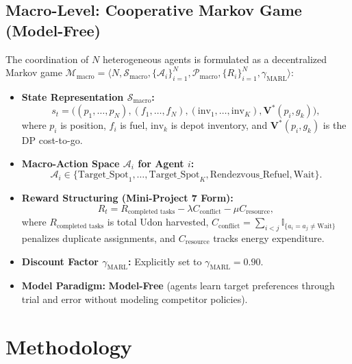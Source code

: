 \documentclass[11pt,a4paper]{article}
\begin{document}
\subsection{Macro-Level: Cooperative Markov Game (Model-Free)}
The coordination of $N$ heterogeneous agents is formulated as a decentralized Markov game $\mathcal{M}_{\text{macro}} = \langle N, \mathcal{S}_{\text{macro}}, \{\mathcal{A}_i\}_{i=1}^N, \mathcal{P}_{\text{macro}}, \{R_i\}_{i=1}^N, \gamma_{\text{MARL}} \rangle$:
\begin{itemize}
    \item \textbf{State Representation $\mathcal{S}_{\text{macro}}$:}
    \begin{equation}
        s_t = \Big( (p_1, \dots, p_N), (f_1, \dots, f_N), (\text{inv}_1, \dots, \text{inv}_K), \mathbf{V}^*(p_i, g_k) \Big),
    \end{equation}
    where $p_i$ is position, $f_i$ is fuel, $\text{inv}_k$ is depot inventory, and $\mathbf{V}^*(p_i, g_k)$ is the DP cost-to-go.
    \item \textbf{Macro-Action Space $\mathcal{A}_i$ for Agent $i$:}
    \begin{equation}
        \mathcal{A}_i \in \{\text{Target\_Spot}_1, \dots, \text{Target\_Spot}_K, \text{Rendezvous\_Refuel}, \text{Wait}\}.
    \end{equation}
    \item \textbf{Reward Structuring (Mini-Project 7 Form):}
    \begin{equation}
        R_t = R_{\text{completed tasks}} - \lambda C_{\text{conflict}} - \mu C_{\text{resource}},
        \label{eq:marl_reward}
    \end{equation}
    where $R_{\text{completed tasks}}$ is total Udon harvested, $C_{\text{conflict}} = \sum_{i < j} \mathbb{I}_{\{a_i = a_j \neq \text{Wait}\}}$ penalizes duplicate assignments, and $C_{\text{resource}}$ tracks energy expenditure.
    \item \textbf{Discount Factor $\gamma_{\text{MARL}}$:} Explicitly set to $\gamma_{\text{MARL}} = 0.90$.
    \item \textbf{Model Paradigm:} \textbf{Model-Free} (agents learn target preferences through trial and error without modeling competitor policies).
\end{itemize}

\section{Methodology}
\end{document}

